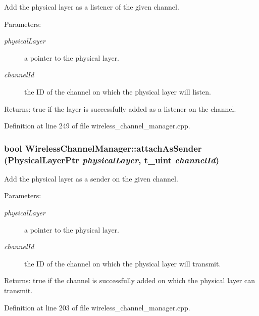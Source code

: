 Add the physical layer as a listener of the given channel. 

\begin{Desc}
\item[Parameters:]
\begin{description}
\item[{\em physical\-Layer}]a pointer to the physical layer. \item[{\em channel\-Id}]the ID of the channel on which the physical layer will listen. \end{description}
\end{Desc}
\begin{Desc}
\item[Returns:]true if the layer is successfully added as a listener on the channel. \end{Desc}


Definition at line 249 of file wireless\_\-channel\_\-manager.cpp.
\subsubsection{\setlength{\rightskip}{0pt plus 5cm}bool Wireless\-Channel\-Manager::attach\-As\-Sender (Physical\-Layer\-Ptr {\em physical\-Layer}, \bf{t\_\-uint} {\em channel\-Id})}\label{classWirelessChannelManager_553dfc07549055977273ddd8b6ee0f60}


Add the physical layer as a sender on the given channel. 

\begin{Desc}
\item[Parameters:]
\begin{description}
\item[{\em physical\-Layer}]a pointer to the physical layer. \item[{\em channel\-Id}]the ID of the channel on which the physical layer will transmit. \end{description}
\end{Desc}
\begin{Desc}
\item[Returns:]true if the channel is successfully added on which the physical layer can transmit. \end{Desc}


Definition at line 203 of file wireless\_\-channel\_\-manager.cpp.
